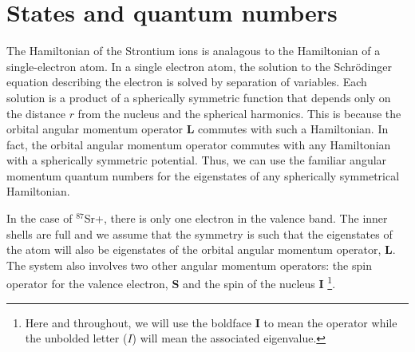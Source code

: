 

%



\section{States and quantum numbers}

The Hamiltonian of the Strontium ions is analagous to the Hamiltonian of a single-electron atom. 
In a single electron atom, the solution to the Schr\"odinger equation describing the electron is solved by separation of variables.
 Each solution is a product of a spherically symmetric function that depends only on the distance $r$ from the nucleus and the spherical harmonics.
This is because the orbital angular momentum operator $\mathbf{L}$ commutes with such a Hamiltonian. In fact, the orbital angular momentum operator commutes with any Hamiltonian with a spherically symmetric potential.
Thus, we can use the familiar angular momentum quantum numbers for the eigenstates of any spherically symmetrical Hamiltonian.

In the case of $^{87}$Sr+, there is only one electron in the valence band. The inner shells are full and we assume that the symmetry is such that the eigenstates of the atom will also be eigenstates of the orbital angular momentum operator, $\mathbf{L}$.
 The system also involves two other angular momentum operators: the spin operator for the valence electron, $\mathbf{S}$%
 and the spin of the nucleus $\mathbf{I}$ \footnote{Here and throughout, we will use the boldface $\mathbf{I}$ to mean the operator while the unbolded letter ($I$) will mean the associated eigenvalue.}.

